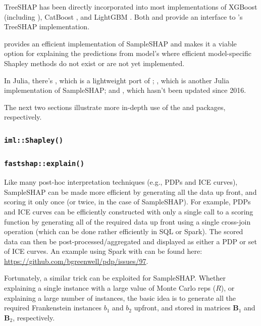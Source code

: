 TreeSHAP has been directly incorporated into most implementations of
XGBoost \citep{chen-2016-xgboost} (including 
\citep{R-xgboost}), CatBoost \citep{eronika-2017-catboost}, and LightGBM
\citep{ke-2017-lightgbm}. Both  \citep{R-fastshap} and
 \citep{R-SHAPforxgboost} provide an interface
to 's TreeSHAP implementation.

 provides an efficient implementation of SampleSHAP
and makes it a viable option for explaining the predictions from model's
where efficient model-specific Shapley methods do not exist or are not
yet implemented.

In Julia, there's , which is a lightweight port of
; , which is another Julia implementation
of SampleSHAP; and , which hasn't been updated
since 2016.

The next two sections illustrate more in-depth use of the  and
 packages, respectively.

\hypertarget{imlshapley}{%
\subsubsection{\texorpdfstring{\texttt{iml::Shapley()}}{iml::Shapley()}}\label{imlshapley}}

\hypertarget{fastshapexplain}{%
\subsubsection{\texorpdfstring{\texttt{fastshap::explain()}}{fastshap::explain()}}\label{fastshapexplain}}

Like many post-hoc interpretation techniques (e.g., PDPs and ICE
curves), SampleSHAP can be made more efficient by generating all the
data up front, and scoring it only once (or twice, in the case of
SampleSHAP). For example, PDPs and ICE curves can be efficiently
constructed with only a single call to a scoring function by generating
all of the required data up front using a single cross-join operation
(which can be done rather efficiently in SQL or Spark). The scored data
can then be post-processed/aggregated and displayed as either a PDP or
set of ICE curves. An example using Spark with 
\citet{R-sparklyr} can be found here:
\url{https://github.com/bgreenwell/pdp/issues/97}.

Fortunately, a similar trick can be exploited for SampleSHAP. Whether
explaining a single instance with a large value of Monte Carlo reps
(\(R\)), or explaining a large number of instances, the basic idea is to
generate all the required Frankenstein instances \(b_1\) and \(b_2\)
upfront, and stored in matrices \(\boldsymbol{B}_1\) and
\(\boldsymbol{B}_2\), respectively.

